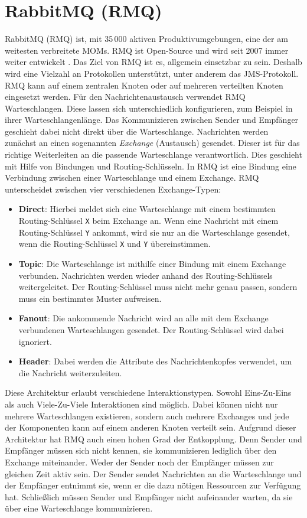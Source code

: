 \section{RabbitMQ (RMQ)}
\label{sec:rmq}
RabbitMQ (RMQ) ist, mit 35\,000 aktiven Produktivumgebungen, eine der am weitesten verbreitete MOMs. 
RMQ ist Open-Source und wird seit 2007 immer weiter entwickelt \cite{rabbitmq}. Das Ziel von RMQ ist es, allgemein einsetzbar zu sein. Deshalb wird eine Vielzahl an Protokollen unterstützt, unter anderem das JMS-Protokoll. RMQ kann auf einem zentralen Knoten oder auf mehreren verteilten Knoten eingesetzt werden. Für den Nachrichtenaustausch verwendet RMQ Warteschlangen. Diese lassen sich unterschiedlich konfigurieren, zum Beispiel in ihrer Warteschlangenlänge. Das Kommunizieren zwischen Sender und Empfänger geschieht dabei nicht direkt über die Warteschlange. Nachrichten werden zunächst an einen sogenannten \emph{Exchange} (Austausch) gesendet. Dieser ist für das richtige Weiterleiten an die passende Warteschlange verantwortlich. Dies geschieht mit Hilfe von Bindungen und Routing-Schlüsseln. In RMQ ist eine Bindung eine Verbindung zwischen einer Warteschlange und einem Exchange. RMQ unterscheidet zwischen vier verschiedenen Exchange-Typen:
\begin{itemize}
    \item \textbf{Direct}: Hierbei meldet sich eine Warteschlange mit einem bestimmten Routing-Schlüssel \texttt{X} beim Exchange an. Wenn eine Nachricht mit einem Routing-Schlüssel \texttt{Y} ankommt, wird sie nur an die Warteschlange gesendet, wenn die Routing-Schlüssel \texttt{X} und \texttt{Y} übereinstimmen.
    \item \textbf{Topic}: Die Warteschlange ist mithilfe einer Bindung mit einem Exchange verbunden. Nachrichten werden wieder anhand des Routing-Schlüssels weitergeleitet. Der Routing-Schlüssel muss nicht mehr genau passen, sondern muss ein bestimmtes Muster aufweisen.
    \item \textbf{Fanout}: Die ankommende Nachricht wird an alle mit dem Exchange verbundenen Warteschlangen gesendet. Der Routing-Schlüssel wird dabei ignoriert.
    \item \textbf{Header}: Dabei werden die Attribute des Nachrichtenkopfes verwendet, um die Nachricht weiterzuleiten.
\end{itemize}
Diese Architektur erlaubt verschiedene Interaktionstypen. Sowohl Eins-Zu-Eins als auch Viele-Zu-Viele Interaktionen sind möglich. Dabei können nicht nur mehrere Warteschlangen existieren, sondern auch mehrere Exchanges und jede der Komponenten kann auf einem anderen Knoten verteilt sein. Aufgrund dieser Architektur hat RMQ auch einen hohen Grad der Entkopplung. Denn Sender und Empfänger müssen sich nicht kennen, sie kommunizieren lediglich über den Exchange miteinander. Weder der Sender noch der Empfänger müssen zur gleichen Zeit aktiv sein. Der Sender sendet Nachrichten an die Warteschlange und der Empfänger entnimmt sie, wenn er die dazu nötigen Ressourcen zur Verfügung hat. Schließlich müssen Sender und Empfänger nicht aufeinander warten, da sie über eine Warteschlange kommunizieren.
